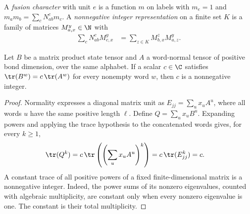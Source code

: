 \begin{definition}%
    \label{def:fusion_character_nimrep}
    \leanok
    A \emph{fusion character} with unit $e$ is a function $m$ on labels with
    $m_e=1$ and $m_am_b=\sum_cN_{ab}^cm_c$. A \emph{nonnegative integer
        representation} on a finite set $K$ is a family of matrices
    $M_{a,x}^y\in\N$ with
    \begin{align}
        \sum_cN_{ab}^cM_{c,x}^y
         & =\sum_{z\in K}M_{b,x}^zM_{a,z}^y.
        \label{eq:mpo_nimrep}
    \end{align}
\end{definition}

\begin{lemma}%
    \label{thm:asymex_fib_anomaly_trace_integral}
    \leanok
    Let $B$ be a matrix product state tensor and $A$ a word-normal tensor
    of positive bond dimension, over the same alphabet. If a scalar
    $c\in\C$ satisfies $\tr(B^w)=c\,\tr(A^w)$ for every nonempty word
    $w$, then $c$ is a nonnegative integer.
\end{lemma}

\begin{proof}
    \leanok
    Normality expresses a diagonal matrix unit as
    $E_{jj}=\sum_ux_uA^u$, where all words $u$ have the same positive
    length $\ell$. Define $Q=\sum_ux_uB^u$. Expanding powers and applying
    the trace hypothesis to the concatenated words gives, for every
    $k\geq1$,
    \begin{align}
        \tr(Q^k)
         & =c\,\tr\left(\left(\sum_ux_uA^u\right)^k\right)
        =c\,\tr(E_{jj}^k)=c.
    \end{align}
    A constant trace of all positive powers of a fixed finite-dimensional
    matrix is a nonnegative integer. Indeed, the power sums of its
    nonzero eigenvalues, counted with algebraic multiplicity, are
    constant only when every nonzero eigenvalue is one. The constant
    is their total multiplicity.
\end{proof}

